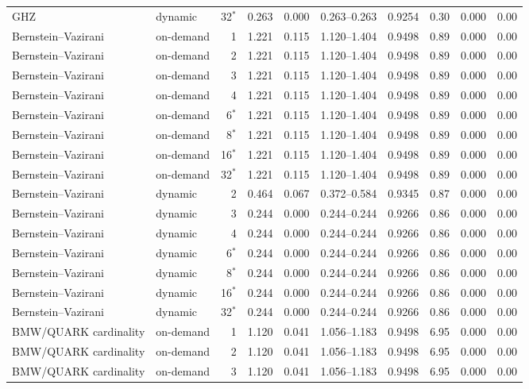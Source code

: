 {\begin{longtable}{@{}llrrrrrrrr@{}}
GHZ & dynamic & 32$^*$ & 0.263 & 0.000 & 0.263--0.263 & 0.9254 & 0.30 & 0.000 & 0.00 \\
Bernstein--Vazirani & on-demand & 1 & 1.221 & 0.115 & 1.120--1.404 & 0.9498 & 0.89 & 0.000 & 0.00 \\
Bernstein--Vazirani & on-demand & 2 & 1.221 & 0.115 & 1.120--1.404 & 0.9498 & 0.89 & 0.000 & 0.00 \\
Bernstein--Vazirani & on-demand & 3 & 1.221 & 0.115 & 1.120--1.404 & 0.9498 & 0.89 & 0.000 & 0.00 \\
Bernstein--Vazirani & on-demand & 4 & 1.221 & 0.115 & 1.120--1.404 & 0.9498 & 0.89 & 0.000 & 0.00 \\
Bernstein--Vazirani & on-demand & 6$^*$ & 1.221 & 0.115 & 1.120--1.404 & 0.9498 & 0.89 & 0.000 & 0.00 \\
Bernstein--Vazirani & on-demand & 8$^*$ & 1.221 & 0.115 & 1.120--1.404 & 0.9498 & 0.89 & 0.000 & 0.00 \\
Bernstein--Vazirani & on-demand & 16$^*$ & 1.221 & 0.115 & 1.120--1.404 & 0.9498 & 0.89 & 0.000 & 0.00 \\
Bernstein--Vazirani & on-demand & 32$^*$ & 1.221 & 0.115 & 1.120--1.404 & 0.9498 & 0.89 & 0.000 & 0.00 \\
Bernstein--Vazirani & dynamic & 2 & 0.464 & 0.067 & 0.372--0.584 & 0.9345 & 0.87 & 0.000 & 0.00 \\
Bernstein--Vazirani & dynamic & 3 & 0.244 & 0.000 & 0.244--0.244 & 0.9266 & 0.86 & 0.000 & 0.00 \\
Bernstein--Vazirani & dynamic & 4 & 0.244 & 0.000 & 0.244--0.244 & 0.9266 & 0.86 & 0.000 & 0.00 \\
Bernstein--Vazirani & dynamic & 6$^*$ & 0.244 & 0.000 & 0.244--0.244 & 0.9266 & 0.86 & 0.000 & 0.00 \\
Bernstein--Vazirani & dynamic & 8$^*$ & 0.244 & 0.000 & 0.244--0.244 & 0.9266 & 0.86 & 0.000 & 0.00 \\
Bernstein--Vazirani & dynamic & 16$^*$ & 0.244 & 0.000 & 0.244--0.244 & 0.9266 & 0.86 & 0.000 & 0.00 \\
Bernstein--Vazirani & dynamic & 32$^*$ & 0.244 & 0.000 & 0.244--0.244 & 0.9266 & 0.86 & 0.000 & 0.00 \\
BMW/QUARK cardinality & on-demand & 1 & 1.120 & 0.041 & 1.056--1.183 & 0.9498 & 6.95 & 0.000 & 0.00 \\
BMW/QUARK cardinality & on-demand & 2 & 1.120 & 0.041 & 1.056--1.183 & 0.9498 & 6.95 & 0.000 & 0.00 \\
BMW/QUARK cardinality & on-demand & 3 & 1.120 & 0.041 & 1.056--1.183 & 0.9498 & 6.95 & 0.000 & 0.00 \\

\end{longtable}}
